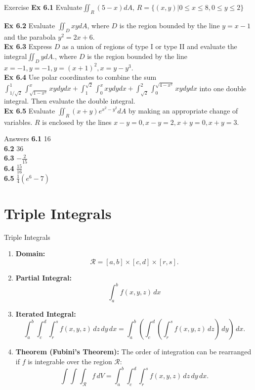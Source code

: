 \documentclass{beamer}
\begin{document}
\begin{frame}{Exercise}
    \textbf{Ex 6.1 }Evaluate$\iint_R(5-x)dA$, $R=\{(x,y)|0\leq x
    \leq 8,0\leq y\leq2\}$\\
    \par
    \textbf{Ex 6.2 }Evaluate $\iint_DxydA$, where $D$ is the region bounded by the line $y=x-1$ and the parabola $y^2=2x+6$.\\
    \textbf{Ex 6.3 }Express $D$ as a union of regions of type I or type II and evaluate the integral$\iint_D ydA$., where $D$ is the region bounded by the line $x=-1,y=-1,y=(x+1)^2,x=y-y^3$.\\
    \textbf{Ex 6.4} Use polar coordinates to combine the sum
    $\int_{1/\sqrt{2}}^1\int_{\sqrt{1-x^2}}^xxydydx+\int_1^{\sqrt{2}}\int_0^xxydydx+\int_{\sqrt{2}}^2\int_0^{\sqrt{4-x^2}}xydydx$ into one double integral. Then evaluate the double integral.\\
    \textbf{Ex 6.5} Evaluate $\iint_R(x+y)e^{x^2-y^2}dA$ by making an appropriate change of variables. $R$ is enclosed by the lines $x-y=0,x-y=2,x+y=0,x+y=3$.
\end{frame}
\begin{frame}{Answers}
    \textbf{6.1} 16\\
    \textbf{6.2} 36\\
    \textbf{6.3} $-\frac{2}{15}$\\
    \textbf{6.4} $\frac{15}{16}$\\
    \textbf{6.5} $\frac{1}{4}(e^6-7)$
\end{frame}


\section{Triple Integrals}
\begin{frame}[label=2]{Triple Integrals}
    \begin{enumerate}
  \item \textbf{Domain:}
  $$\mathcal{R} = [a, b] \times [c, d] \times [r,s].$$

  \item \textbf{Partial Integral:}
  $$\int_a^b f(x, y, z) \, dx$$

  \item \textbf{Iterated Integral:}
  $$\int_a^b \int_c^d \int_r^s f(x, y, z) \, dz \, dy \, dx = \int_a^b \left(\int_c^d \left(\int_r^s f(x, y, z) \, dz\right) \, dy\right) \, dx.$$

  \item \textbf{Theorem (Fubini’s Theorem):} The order of integration can be rearranged if $f$ is integrable over the region $\mathcal{R}$:
  $$\int \int \int_{\mathcal{R}} f \, dV = \int_a^b \int_c^d \int_r^s f(x, y, z) \, dz \, dy \, dx.$$

\end{enumerate}

\end{frame}
\end{document}
